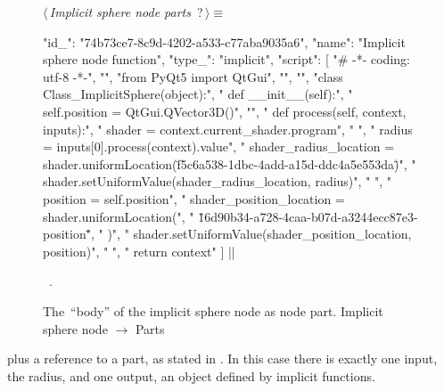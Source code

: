 \documentclass[%
    a4paper,    %
    justified,  %
    nobib,      %
    openany     %
]{tufte-book}
\makeatletter
\renewcommand{\label}[1]{\@tufte@label{##1}}%
\makeatother
\begin{document}
\begin{figure}
\begin{flushleft} \small
\begin{minipage}{\linewidth}\label{scrap104}\raggedright\small
{} $\langle\,${\itshape Implicit sphere node parts}\nobreak\ {\footnotesize {?}}$\,\rangle\equiv$
\vspace{-1ex}
\begin{pythoncode}
{
    "id_": "74b73ce7-8c9d-4202-a533-c77aba9035a6",
    "name": "Implicit sphere node function",
    "type_": "implicit",
    "script": [
        "# -*- coding: utf-8 -*-",
        "",
        "from PyQt5 import QtGui",
        "",
        "",
        "class Class_ImplicitSphere(object):",
        "    def __init__(self):",
        "        self.position = QtGui.QVector3D()",
        "",
        "    def process(self, context, inputs):",
        "        shader = context.current_shader.program",
        "        ",
        "        radius = inputs[0].process(context).value",
        "        shader_radius_location = shader.uniformLocation(\"f5c6a538-1dbc-4add-a15d-ddc4a5e553da\")",
        "        shader.setUniformValue(shader_radius_location, radius)",
        "        ",
        "        position = self.position",
        "        shader_position_location = shader.uniformLocation(",
        "            \"16d90b34-a728-4caa-b07d-a3244ecc87e3-position\"",
        "        )",
        "        shader.setUniformValue(shader_position_location, position)",
        "        ",
        "        return context"
    ]
}|\NWsep|
\end{pythoncode}
\vspace{1.5ex}
\footnotesize
\begin{list}{}{\setlength{\itemsep}{-\parsep}\setlength{\itemindent}{-\leftmargin}}
\item \NWtxtMacroRefIn\ .

\item{}
\end{list}
\end{minipage}\vspace{4ex}
\end{flushleft}
\caption{The~\enquote{body} of the implicit sphere node as node part.
  \newline{}\newline{}Implicit sphere node $\rightarrow$ Parts}
\label{editor:lst:nodes:sphere-node:parts:body}
\end{figure}

 plus a reference
to a part, as stated in . In this case there is exactly one
input, the radius, and one output, an object defined by implicit functions.
\end{document}
